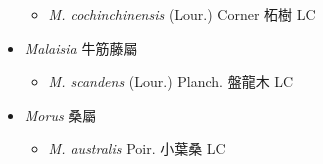 \begin{itemize}
  \begin{itemize}
        \item[] \textit{M. cochinchinensis} (Lour.) Corner  柘樹   LC
  \end{itemize}
 \item[] \textit{Malaisia} 牛筋藤屬
                                
  \begin{itemize}
        \item[] \textit{M. scandens} (Lour.) Planch.  盤龍木   LC
  \end{itemize}
 \item[] \textit{Morus} 桑屬
                                
  \begin{itemize}
        \item[] \textit{M. australis} Poir.  小葉桑   LC
  \end{itemize}
  \end{itemize}
